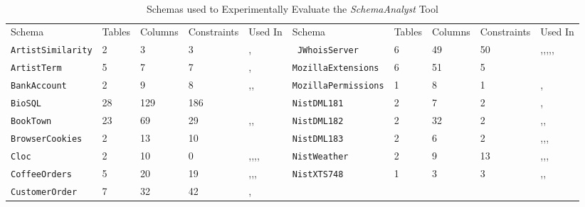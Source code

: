 \begin{table*}[t]
  \scriptsize
  \centering
  \caption{Schemas used to Experimentally Evaluate the \textit{SchemaAnalyst} Tool}~\label{tab:schemas}
  \begin{tabular}{llllllllll}
    Schema&Tables&Columns&Constraints&Used In&Schema&Tables&Columns&Constraints&Used In \\
    {\tt ArtistSimilarity}&2&3&3&\cite{mcminn2015effectiveness},\cite{wright2014impact} &
    {\tt
    JWhoisServer}&6&49&50&\cite{kapfhammer2013search},\cite{mcminn2015effectiveness},\cite{kinneer2015automatically},\cite{wright2013efficient},\cite{wright2014impact},\cite{mcminn2016virtual}\\
    {\tt ArtistTerm}&5&7&7&\cite{wright2014impact},\cite{mcminn2015effectiveness}&
    {\tt MozillaExtensions}&6&51&5&\cite{mcminn2015effectiveness} \\
    {\tt BankAccount} &2&9&8&\cite{kapfhammer2013search},\cite{wright2014impact},\cite{mcminn2015effectiveness}&
    {\tt MozillaPermissions} &1&8&1&\cite{mcminn2016virtual},\cite{mcminn2015effectiveness}\\
    {\tt BioSQL} &28&129&186&\cite{kinneer2015automatically}&
    {\tt NistDML181} &2&7&2&\cite{kapfhammer2013search},\cite{mcminn2015effectiveness}  \\
    {\tt BookTown} &23&69&29&\cite{kapfhammer2013search},\cite{wright2014impact},\cite{mcminn2015effectiveness}&
    {\tt NistDML182} &2&32&2&\cite{kapfhammer2013search},\cite{wright2013efficient},\cite{mcminn2015effectiveness}  \\
    {\tt BrowserCookies} &2&13&10&\cite{mcminn2015effectiveness}&
    {\tt NistDML183} &2&6&2&\cite{kapfhammer2013search},\cite{wright2013efficient},\cite{wright2014impact},\cite{mcminn2015effectiveness}  \\
    {\tt Cloc} &2&10&0&\cite{kapfhammer2013search},\cite{wright2013efficient},\cite{wright2014impact},\cite{mcminn2015effectiveness},\cite{kinneer2015automatically}&
    {\tt NistWeather} &2&9&13&\cite{mcminn2016virtual},\cite{kapfhammer2013search},\cite{mcminn2015effectiveness},\cite{kinneer2015automatically}\\
    {\tt CoffeeOrders} &5&20&19&\cite{mcminn2016virtual},\cite{kapfhammer2013search},\cite{wright2014impact},\cite{mcminn2015effectiveness}&
    {\tt NistXTS748} &1&3&3&\cite{kapfhammer2013search},\cite{mcminn2015effectiveness},\cite{kinneer2015automatically} \\
    {\tt CustomerOrder} &7&32&42&\cite{kapfhammer2013search},\cite{mcminn2015effectiveness}&

\end{tabular}
\end{table*}
